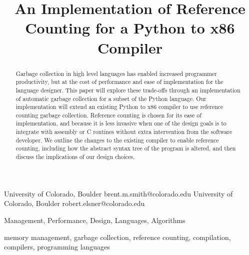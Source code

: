 \documentclass{sigplanconf}
\begin{document}
\copyrightdata{[to be supplied]} 


\title{An Implementation of Reference Counting for a Python to x86 Compiler}

           {University of Colorado, Boulder}
           {brent.m.smith@colorado.edu}
           {University of Colorado, Boulder}
           {robert.elsner@colorado.edu}

\maketitle

\begin{abstract}
Garbage collection in high level languages has enabled increased programmer productivity, but at the cost of performance and ease of implementation for the language designer.  This paper will explore these trade-offs through an implementation of automatic garbage collection for a subset of the Python language.   Our implementation will extend an existing Python to x86 compiler to use reference counting garbage collection.  Reference counting is chosen for its ease of implementation, and because it is less invasive when one of the design goals is to integrate with assembly or C routines without extra intervention from the software developer.  We outline the changes to the existing compiler to enable reference counting, including how the abstract syntax tree of the program is altered, and then discuss the implications of our design choices.
\end{abstract}


\terms
Management, Performance, Design, Languages, Algorithms

\keywords
memory management, garbage collection, reference counting, compilation, compilers, programming languages
\end{document}
